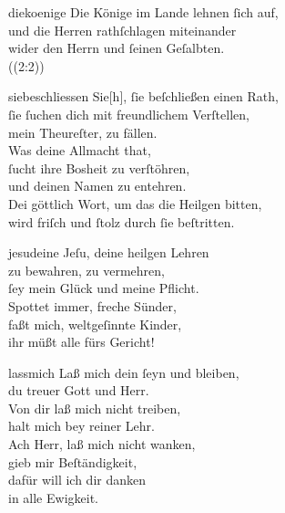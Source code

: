 \documentclass[tocstyle=ref-genre]{ees}
\begin{document}
{  \begin{movement}{diekoenige}
    \voice[Coro]
    Die Könige im Lande lehnen ſich auf,\\
    und die Herren rathſchlagen miteinander\\
    wider den Herrn und ſeinen Geſalbten.\\
    ((2:2))
  \end{movement}

  \begin{movement}{siebeschliessen}
    \voice[Alto]
    Sie[h], ſie beſchließen einen Rath,\\
    ſie ſuchen dich mit freundlichem Verſtellen,\\
    mein Theureſter, zu fällen.\\
    Was deine Allmacht that,\\
    ſucht ihre Bosheit zu verſtöhren,\\
    und deinen Namen zu entehren.\\
    Dei göttlich Wort, um das die Heilgen bitten,\\
    wird friſch und ſtolz durch ſie beſtritten.
  \end{movement}

  \begin{movement}{jesudeine}
    \voice[Alto]
    Jeſu, deine heilgen Lehren\\
    zu bewahren, zu vermehren,\\
    ſey mein Glück und meine Pflicht.\\[1ex]
    Spottet immer, freche Sünder,\\
    faßt mich, weltgeſinnte Kinder,\\
    ihr müßt alle fürs Gericht!
  \end{movement}

  \begin{movement}{lassmich}
    \voice[Coro]
    Laß mich dein ſeyn und bleiben,\\
    du treuer Gott und Herr.\\
    Von dir laß mich nicht treiben,\\
    halt mich bey reiner Lehr.\\
    Ach Herr, laß mich nicht wanken,\\
    gieb mir Beſtändigkeit,\\
    dafür will ich dir danken\\
    in alle Ewigkeit.
  \end{movement}

}
\end{document}
